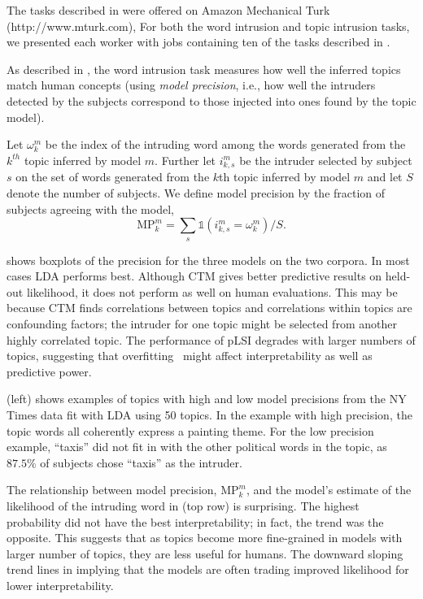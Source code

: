 The tasks described in  were offered on Amazon
Mechanical Turk (http://www.mturk.com), 
For both the word intrusion and topic intrusion tasks, we presented
each worker with jobs containing ten of the tasks described in
.

As described in , the word intrusion task
measures how well the inferred topics match human concepts (using
\emph{model precision}, i.e., how well the intruders detected by the
subjects correspond to those injected into ones found by the topic model).  

Let $\omega^{m}_{k}$ be the index of the intruding word among the words generated
from the $k^{th}$ topic inferred by model $m$.  Further let $i^m_{k, s}$ be
the intruder selected by subject $s$ on the set of words generated from the
$k$th topic inferred by model $m$ and let $S$ denote the number of subjects.  We
define model precision by the fraction of subjects agreeing with the model,
\begin{equation}
  \mathrm{MP}^m_k = \textstyle \sum_{s} \mathds{1}(i^m_{k,s} = \omega^{m}_{k}) / S.
  \label{eq:mp}
\end{equation}


 shows boxplots of the precision for the three
models on the two corpora.  In most cases LDA performs best. Although
CTM gives better predictive results on held-out likelihood, it does
not perform as well on human evaluations. This may be because CTM
finds correlations between topics and correlations within topics are
confounding factors; the intruder for one topic might be selected from
another highly correlated topic.  The performance of pLSI degrades
with larger numbers of topics, suggesting that
overfitting~\cite{blei-03} might affect interpretability as well as
predictive power.

 (left) shows examples of topics with high
and low model precisions from the NY Times data fit with LDA using 50
topics. In the example with high precision, the topic words all
coherently express a painting theme.  For the low precision example,
 ``taxis'' did not fit in with the other
political words in the topic, as $87.5\%$ of subjects chose ``taxis''
as the intruder.


The relationship between model precision, $\mathrm{MP}^m_k$, and the
model's estimate of the likelihood of the intruding word in
 (top row) is surprising.  The highest
probability did not have the best interpretability; in fact, the trend
was the opposite.  This suggests that as topics become more
fine-grained in models with larger number of topics, they are less
useful for humans.  The downward sloping trend lines in
 implying that the models are often trading
improved likelihood for lower interpretability.


